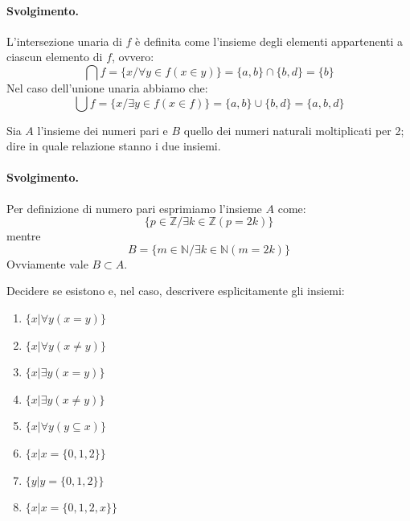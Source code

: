 \paragraph{Svolgimento.} L'intersezione unaria di $f$ è definita come l'insieme degli elementi appartenenti a ciascun elemento di $f$, ovvero:
\begin{displaymath}
	\bigcap f = \{x / \forall y \in f (x \in y)\} = \{a,b\} \cap \{b,d\}= \{b\}
\end{displaymath}
Nel caso dell'unione unaria abbiamo che:
\begin{displaymath}
	\bigcup f = \{x / \exists y \in f (x \in f)\} = \{a,b\} \cup \{b,d\} = \{a,b,d\}
\end{displaymath}
\hfill \blacksquare
\begin{exsbox}
	Sia $A$ l'insieme dei numeri pari e $B$ quello dei numeri naturali moltiplicati per 2; dire in quale relazione stanno i due insiemi.
\end{exsbox}
\paragraph*{Svolgimento.} Per definizione di numero pari esprimiamo l'insieme $A$ come: $$\{p \in \mathbb{Z} / \exists k \in \mathbb{Z}(p = 2k)\}$$ mentre $$B= \{m \in \mathbb{N} / \exists k \in \mathbb{N} (m = 2k) \}$$ Ovviamente vale $B \subset A$. \hfill \blacksquare
\begin{exsbox}
	Decidere se esistono e, nel caso, descrivere esplicitamente gli insiemi:
	\begin{enumerate}
		\item $\{x | \forall y(x=y) \} $
		\item $\{ x|\forall y(x \neq y) \}$
		\item $ \{ x| \exists y (x=y)\}$
		\item $\{x|\exists y(x \neq y)\}$
		\item $ \{ x| \forall y (y \subseteq x) \}$
		\item $\{x|x=\{0,1,2\} \}$
		\item $\{y|y=\{0,1,2\} \}$
		\item $\{ x | x= \{0,1,2,x \} \}$
	\end{enumerate}
\end{exsbox}
